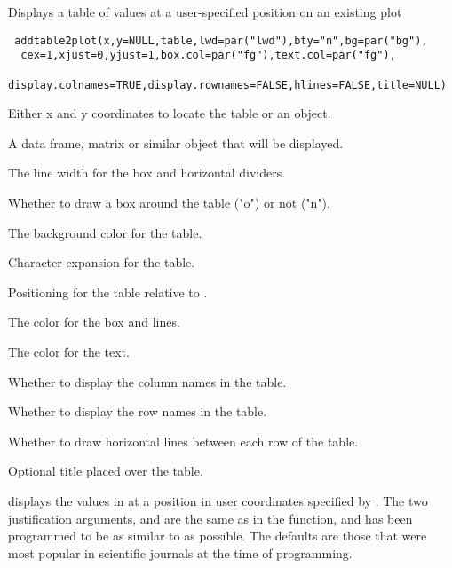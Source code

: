 \begin{Description}\relax
Displays a table of values at a user-specified position on an existing plot
\end{Description}
\begin{Usage}
\begin{verbatim}
 addtable2plot(x,y=NULL,table,lwd=par("lwd"),bty="n",bg=par("bg"),
  cex=1,xjust=0,yjust=1,box.col=par("fg"),text.col=par("fg"),
  display.colnames=TRUE,display.rownames=FALSE,hlines=FALSE,title=NULL)
\end{verbatim}
\end{Usage}
\begin{Arguments}
\begin{ldescription}
\item[\code{x,y}] Either x and y coordinates to locate the table or an
 object.
\item[\code{table}] A data frame, matrix or similar object that will be displayed.
\item[\code{lwd}] The line width for the box and horizontal dividers.
\item[\code{bty}] Whether to draw a box around the table ("o") or not ("n").
\item[\code{bg}] The background color for the table.
\item[\code{cex}] Character expansion for the table.
\item[\code{xjust,yjust}] Positioning for the table relative to .
\item[\code{box.col}] The color for the box and lines.
\item[\code{text.col}] The color for the text.
\item[\code{display.colnames}] Whether to display the column names in the table.
\item[\code{display.rownames}] Whether to display the row names in the table.
\item[\code{hlines}] Whether to draw horizontal lines between each row of the table.
\item[\code{title}] Optional title placed over the table.
\end{ldescription}
\end{Arguments}
\begin{Details}\relax
{} displays the values in  at a position in user
coordinates specified by . The two justification arguments,
 and  are the same as in the  function,
and  has been programmed to be as similar to 
as possible. The defaults are those that were most popular in scientific
journals at the time of programming.
\end{Details}
